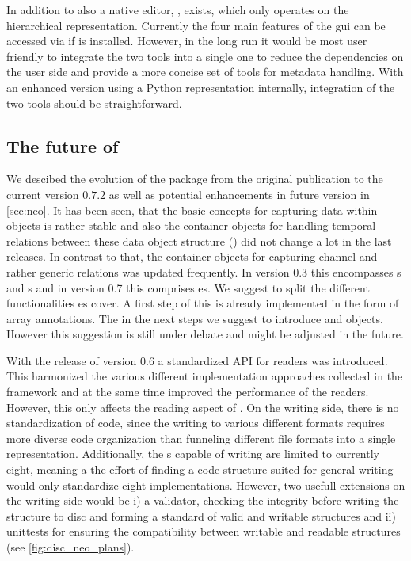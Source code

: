 In addition to  also a native  editor, , exists, which only operates on the hierarchical  representation. Currently the four main features of the  gui can be accessed via  if  is installed. However, in the long run it would be most user friendly to integrate the two tools into a single one to reduce the dependencies on the user side and provide a more concise set of tools for metadata handling. With an enhanced  version using a Python  representation internally, integration of the two tools should be straightforward.

\subsection{The future of }
We descibed the evolution of the  package from the original publication \cite{Garcia_2014} to the current version $0.7.2$ as well as potential enhancements in future version in \cref{sec:neo}. It has been seen, that the basic concepts for capturing data within  objects is rather stable and also the  container objects for handling temporal relations between these data object structure () did not change a lot in the last releases. In contrast to that, the container objects for capturing channel and rather generic relations was updated frequently. In  version $0.3$ this encompasses s and s and in  version 0.7 this comprises es. We suggest to split the different functionalities es cover. A first step of this is already implemented in the form of array annotations. The in the next steps we suggest to introduce  and  objects. However this suggestion is still under debate and might be adjusted in the future. 

With the release of  version $0.6$ a standardized API for readers was introduced. This harmonized the various different implementation approaches collected in the  framework and at the same time improved the performance of the readers. However, this only affects the reading aspect of . On the writing side, there is no standardization of code, since the writing to various different formats requires more diverse code organization than funneling different file formats into a single representation. Additionally, the s capable of writing are limited to currently eight, meaning a the effort of finding a code structure suited for general writing would only standardize eight implementations. However, two usefull extensions on the writing side would be i) a validator, checking the integrity before writing the  structure to disc and forming a standard of valid and writable  structures and ii) unittests for ensuring the compatibility between writable and readable  structures (see \cref{fig:disc_neo_plans}).

